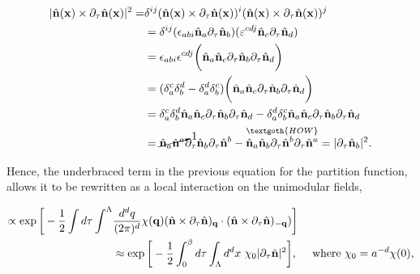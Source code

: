 \begin{equation}
    \begin{split}
        |\hat{\bf n}({\bf x}) \times \partial_{\tau} \hat{\bf n}({\bf x})|^2 =& \delta^{ij} (\hat{\bf n}({\bf x}) \times \partial_{\tau} \hat{\bf n}({\bf x}))^{i} (\hat{\bf n}({\bf x}) \times \partial_{\tau} \hat{\bf n}({\bf x}))^{j} \\
        &= \delta^{ij} (\epsilon_{abi} \hat{\bf n}_{a} \partial_{\tau} \hat{\bf n}_{b}) (\varepsilon^{cdj} \hat{\bf n}_{c} \partial_{\tau} \hat{\bf n}_{d}) \\
        &= \epsilon_{abi} \epsilon^{cdj} 
        \bigg(
        \hat{\bf n}_{a} \hat{\bf n}_{c} \partial_{\tau} \hat{\bf n}_{b} \partial_{\tau} \hat{\bf n}_{d}
        \bigg) \\
        &= (\delta^{c}_{a} \delta^{d}_{b} - \delta^{d}_{a} \delta^{c}_{b})\bigg(
        \hat{\bf n}_{a} \hat{\bf n}_c \partial_{\tau} \hat{\bf n}_{b} \partial_{\tau} \hat{\bf n}_{d}
        \bigg) \\
        &= \delta^{c}_{a} \delta^{d}_{b} \hat{\bf n}_{a} \hat{\bf n}_{c} \partial_{\tau} \hat{\bf n}_{b} \partial_{\tau} \hat{\bf n}_{d}
        - \delta^{d}_{a} \delta^{c}_{b}\hat{\bf n}_a \hat{\bf n}_c \partial_{\tau} \hat{\bf n}_{b} \partial_{\tau} \hat{\bf n}_d \\
        &= \cancelto{1}{\hat{\bf n}_{a} \hat{\bf n}^{a}} \partial_{\tau} \hat{\bf n}_{b} \partial_{\tau} \hat{\bf n}^{b} 
        - \overset{\textgoth{HOW}}{
        \hat{\bf n}_{a} \hat{\bf n}_{b} \partial_{\tau} \hat{\bf n}^{b} \partial_{\tau} \hat{\bf n}^{a}} 
        = |\partial_{\tau} \hat{\bf n}_{b}|^2.
     \end{split}
\end{equation}

Hence, the underbraced term in the previous equation for the partition function, allows it to be rewritten as a local interaction on the unimodular fields, 

\begin{equation}
\begin{split}
    \propto \exp\bigg[-\frac{1}{2} \int d\tau \int^\Lambda & \frac{d^d q}{(2\pi)^d} \chi({\bf q}) (\hat{{\bf n}} \times \partial_{\tau} \hat{{\bf n}})_{{\bf q}} \cdot (\hat{{\bf n}} \times \partial_{\tau} \hat{{\bf n}})_{-{\bf q}})
    \bigg] \\
    & \approx \exp \bigg[
    -\frac{1}{2} \int_{0}^{\beta} d\tau \int_{\Lambda} d^dx \textnormal{ } \chi_0 |\partial_{\tau} \hat{{\bf n}}|^2 \bigg], \quad \textnormal{ where } \chi_0 = a^{-d} \chi(0),
\end{split}
\end{equation}

